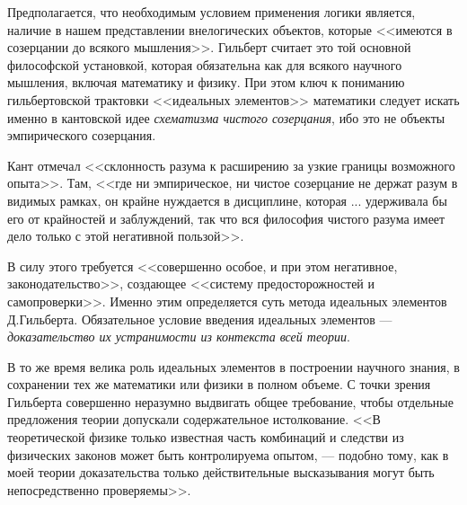 \documentclass[a4page]{article}
\begin{document}
Предполагается, что необходимым условием применения логики является,
наличие в нашем представлении внелогических объектов,
которые <<имеются в созерцании до всякого мышления>>.
Гильберт считает это той основной философской установкой,
которая обязательна как для всякого научного мышления, включая математику и физику.
При этом ключ к пониманию гильбертовской трактовки <<идеальных элементов>> математики
следует искать именно в кантовской идее \textit{схематизма чистого созерцания},
ибо это не объекты эмпирического созерцания.

Кант отмечал <<склонность разума к расширению за узкие границы возможного опыта>>.
Там, <<где ни эмпирическое, ни чистое созерцание не держат разум в видимых рамках,
он крайне нуждается в дисциплине, которая ... удерживала бы его от крайностей и заблуждений,
так что вся философия чистого разума имеет дело только с этой негативной пользой>>.

В силу этого требуется <<совершенно особое, и при этом негативное, законодательство>>,
создающее <<систему предосторожностей и самопроверки>>. %
Именно этим определяется суть метода идеальных элементов Д.Гильберта.
Обязательное условие введения идеальных элементов ---
\textit{доказательство их устранимости из контекста всей теории}. %

В то же время велика роль идеальных элементов в построении научного знания,
в сохранении тех же математики или физики в полном объеме.
С точки зрения Гильберта совершенно неразумно выдвигать общее требование,
чтобы отдельные предложения теории допускали содержательное истолкование.
<<В теоретической физике только известная часть комбинаций и следстви
из физических законов может быть контролируема опытом, --- подобно тому,
как в моей теории доказательства только действительные высказывания
могут быть непосредственно проверяемы>>. %
\end{document}
